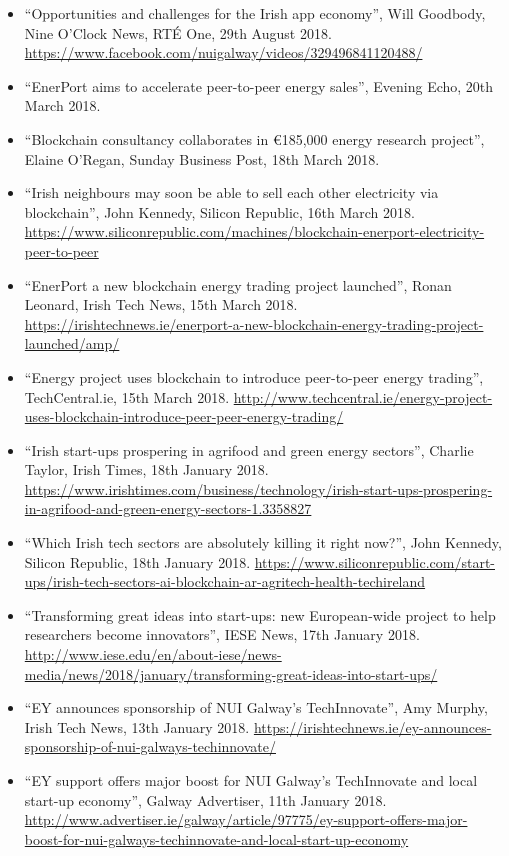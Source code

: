 \documentclass[10pt,a4paper]{res} %
\begin{document}
\begin{resume}
{\begin{itemize} \itemsep -2pt
\renewcommand\labelitemi{$\circ$}
\item ``Opportunities and challenges for the Irish app economy'', Will Goodbody, Nine O'Clock News, RT\'{E} One, 29th August 2018. \url{https://www.facebook.com/nuigalway/videos/329496841120488/}
\item ``EnerPort aims to accelerate peer-to-peer energy sales'', Evening Echo, 20th March 2018.
\item ``Blockchain consultancy collaborates in \euro{}185,000 energy research project'', Elaine O'Regan, Sunday Business Post, 18th March 2018.
\item ``Irish neighbours may soon be able to sell each other electricity via blockchain'', John Kennedy, Silicon Republic, 16th March 2018. \url{https://www.siliconrepublic.com/machines/blockchain-enerport-electricity-peer-to-peer}
\item ``EnerPort a new blockchain energy trading project launched'', Ronan Leonard, Irish Tech News, 15th March 2018. \url{https://irishtechnews.ie/enerport-a-new-blockchain-energy-trading-project-launched/amp/}
\item ``Energy project uses blockchain to introduce peer-to-peer energy trading'', TechCentral.ie, 15th March 2018. \url{http://www.techcentral.ie/energy-project-uses-blockchain-introduce-peer-peer-energy-trading/}
\item ``Irish start-ups prospering in agrifood and green energy sectors'', Charlie Taylor, Irish Times, 18th January 2018. \url{https://www.irishtimes.com/business/technology/irish-start-ups-prospering-in-agrifood-and-green-energy-sectors-1.3358827}
\item ``Which Irish tech sectors are absolutely killing it right now?'', John Kennedy, Silicon Republic, 18th January 2018. \url{https://www.siliconrepublic.com/start-ups/irish-tech-sectors-ai-blockchain-ar-agritech-health-techireland}
\item ``Transforming great ideas into start-ups: new European-wide project to help researchers become innovators'', IESE News, 17th January 2018. \url{http://www.iese.edu/en/about-iese/news-media/news/2018/january/transforming-great-ideas-into-start-ups/}
\item ``EY announces sponsorship of NUI Galway's TechInnovate'', Amy Murphy, Irish Tech News, 13th January 2018. \url{https://irishtechnews.ie/ey-announces-sponsorship-of-nui-galways-techinnovate/}
\item ``EY support offers major boost for NUI Galway's TechInnovate and local start-up economy'', Galway Advertiser, 11th January 2018. \url{http://www.advertiser.ie/galway/article/97775/ey-support-offers-major-boost-for-nui-galways-techinnovate-and-local-start-up-economy}

\end{itemize}}
\end{resume}
\end{document}
